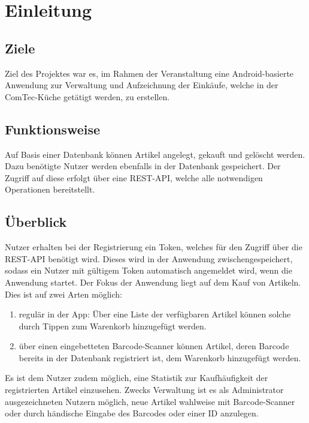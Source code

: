 \section{Einleitung}\label{sec:einleitung}

\subsection{Ziele}\label{subsec:ziele}

Ziel des Projektes war es, im Rahmen der Veranstaltung  eine Android-basierte Anwendung zur Verwaltung und Aufzeichnung der Einkäufe, welche in der ComTec-Küche getätigt werden, zu erstellen.

\subsection{Funktionsweise}\label{subsec:funktionsweise}

Auf Basis einer Datenbank können Artikel angelegt, gekauft und gelöscht werden.
Dazu benötigte Nutzer werden ebenfalls in der Datenbank gespeichert.
Der Zugriff auf diese erfolgt über eine REST-API, welche alle notwendigen Operationen bereitstellt.

\subsection{Überblick}\label{subsec:überblick}

Nutzer erhalten bei der Registrierung ein Token, welches für den Zugriff über die REST-API benötigt wird.
Dieses wird in der Anwendung zwischengespeichert, sodass ein Nutzer mit gültigem Token automatisch angemeldet wird, wenn die Anwendung startet.
Der Fokus der Anwendung liegt auf dem Kauf von Artikeln.
Dies ist auf zwei Arten möglich:

\begin{enumerate}
	\item regulär in der App: Über eine Liste der verfügbaren Artikel können solche durch Tippen zum Warenkorb hinzugefügt werden.

	\item über einen eingebetteten Barcode-Scanner können Artikel, deren Barcode bereits in der Datenbank registriert ist, dem Warenkorb hinzugefügt werden.
\end{enumerate}

Es ist dem Nutzer zudem möglich, eine Statistik zur Kaufhäufigkeit der registrierten Artikel einzusehen.
Zwecks Verwaltung ist es als Administrator ausgezeichneten Nutzern möglich, neue Artikel wahlweise mit Barcode-Scanner oder durch händische Eingabe des Barcodes oder einer ID anzulegen.

